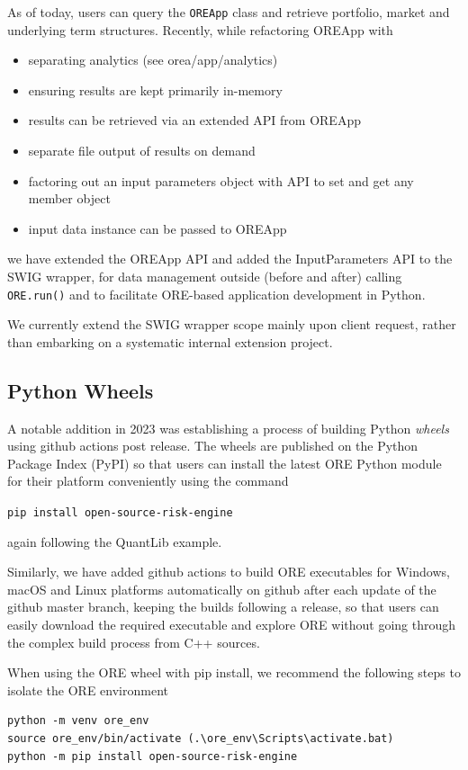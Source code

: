 \documentclass[12pt, a4paper]{report}
\begin{document}
As of today, users can query the {\tt OREApp} class and retrieve portfolio, market and underlying
term structures. Recently, while refactoring OREApp with
\begin{itemize}
\item separating analytics (see orea/app/analytics) 
\item ensuring results are kept primarily in-memory
\item results can be retrieved via an extended API from OREApp
\item separate file output of results on demand 
\item factoring out an input parameters object with API to set and get any member object
\item input data instance can be passed to OREApp
\end{itemize}
we have extended the OREApp API and added the InputParameters API to the SWIG wrapper,
for data management outside (before and after) calling {\tt ORE.run()} and to facilitate
ORE-based application development in Python.

We currently extend the SWIG wrapper scope mainly upon client request, rather than embarking
on a systematic internal extension project. 

\subsection*{Python Wheels}

A notable addition in 2023 was establishing a process of building Python {\em wheels} using github
actions post release. The wheels are published on the Python Package Index (PyPI) so that users can
install the latest ORE Python module for their platform conveniently using the command

\centerline{\tt pip install open-source-risk-engine}

again following the QuantLib example.

Similarly, we have added github actions to build ORE executables for Windows, macOS and
Linux platforms automatically on github after each update of the github master branch, keeping
the builds following a release, so that users can easily download the required executable and
explore ORE without going through the complex build process from C++ sources.

When using the ORE wheel with pip install, we recommend the following steps to isolate the ORE environment
\begin{verbatim}
python -m venv ore_env
source ore_env/bin/activate (.\ore_env\Scripts\activate.bat)
python -m pip install open-source-risk-engine
\end{verbatim}
\end{document}
